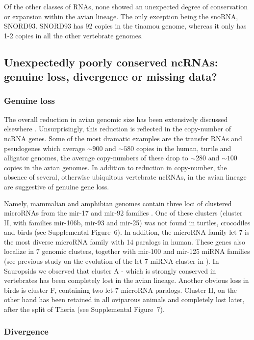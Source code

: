 \documentclass[10pt]{bmc_article}
\newenvironment{bmcformat}{\begin{raggedright}\baselineskip20pt\sloppy\setboolean{publ}{false}}{\end{raggedright}\baselineskip20pt\sloppy}
\begin{document}
\begin{bmcformat}
Of the other classes of RNAs, none showed an unexpected degree of
conservation or expansion within the avian lineage. The only exception
being the snoRNA, SNORD93. SNORD93 has 92 copies in the tinamou
genome, whereas it only has 1-2 copies in all the other vertebrate
genomes.

\subsection*{Unexpectedly poorly conserved  ncRNAs: genuine loss, divergence or missing  data?}

\subsubsection*{Genuine loss}

The overall reduction in avian genomic size has been extensively
discussed elsewhere \cite{Organ:2007}. Unsurprisingly, this reduction
is reflected in the copy-number of ncRNA genes. Some of the most
dramatic examples are the transfer RNAs and pseudogenes which average
$\sim900$ and $\sim580$ copies in the human, turtle and alligator
genomes, the average copy-numbers of these drop to $\sim280$ and
$\sim100$ copies in the avian genomes. In addition to reduction in
copy-number, the absence of several, otherwise ubiquitous vertebrate
ncRNAs, in the avian lineage are suggestive of genuine gene loss.

Namely, mammalian and amphibian genomes contain three loci of
clustered microRNAs from the mir-17 and mir-92 families
\cite{Tanzer:04}. One of these clusters (cluster II, with families
mir-106b, mir-93 and mir-25) was not found in turtles, crocodiles and
birds (see Supplemental Figure~6). In addition, the microRNA family
let-7 is the most diverse microRNA family with 14 paralogs in
human. These genes also localize in 7 genomic clusters, together with
mir-100 and mir-125 miRNA families (see previous study on the
evolution of the let-7 miRNA cluster in \cite{Hertel:2012}). In Sauropsids we
observed that cluster A - which is strongly conserved in vertebrates
has been completely lost in the avian lineage.  Another obvious loss
in birds is cluster F, containing two let-7 microRNA paralogs. Cluster
H, on the other hand has been retained in all oviparous animals and
completely lost later, after the split of Theria (see Supplemental
Figure~7).

\subsubsection*{Divergence}


\end{bmcformat}
\end{document}
